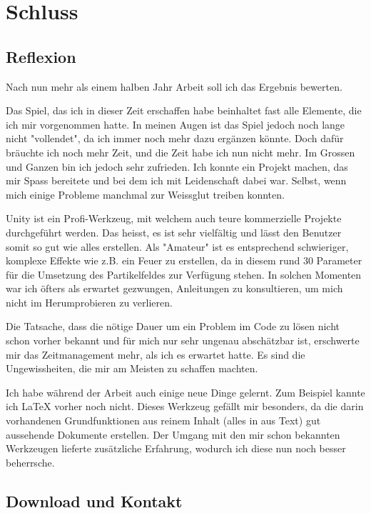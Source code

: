 \chapter{Schluss}

\section{Reflexion }

Nach nun mehr als einem halben Jahr Arbeit soll ich das Ergebnis bewerten.

\smallskip
Das Spiel, das ich in dieser Zeit erschaffen habe beinhaltet fast alle Elemente, die ich mir vorgenommen hatte.
In meinen Augen ist das Spiel jedoch noch lange nicht "vollendet", da ich immer noch mehr dazu ergänzen könnte.
Doch dafür bräuchte ich noch mehr Zeit, und die Zeit habe ich nun nicht mehr.
Im Grossen und Ganzen bin ich jedoch sehr zufrieden. Ich konnte ein Projekt machen, das mir Spass bereitete und bei dem ich mit Leidenschaft dabei war. Selbst, wenn mich einige Probleme manchmal zur Weissglut treiben konnten. 

\smallskip
Unity ist ein Profi-Werkzeug, mit welchem auch teure kommerzielle Projekte durchgeführt werden. Das heisst, es ist sehr vielfältig und lässt den Benutzer somit so gut wie alles erstellen.
Als "Amateur" ist es entsprechend schwieriger, komplexe Effekte wie z.B. ein Feuer zu erstellen, da in diesem rund 30 Parameter für die Umsetzung des Partikelfeldes zur Verfügung stehen.
In solchen Momenten war ich öfters als erwartet gezwungen, Anleitungen zu konsultieren, um mich nicht im Herumprobieren zu verlieren.

\smallskip
Die Tatsache, dass die nötige Dauer um ein Problem im Code zu lösen nicht schon vorher bekannt  und für mich nur sehr ungenau abschätzbar ist, erschwerte mir das Zeitmanagement mehr, als ich es erwartet hatte.
Es sind die Ungewissheiten, die mir am Meisten zu schaffen machten.

\smallskip
Ich habe während der Arbeit auch einige neue Dinge gelernt.
Zum Beispiel kannte ich LaTeX vorher noch nicht.
Dieses Werkzeug gefällt mir besonders, da die darin vorhandenen Grundfunktionen aus reinem Inhalt (alles in aus Text) gut aussehende Dokumente erstellen.
Der Umgang mit den mir schon bekannten Werkzeugen lieferte zusätzliche Erfahrung, wodurch ich diese nun noch besser beherrsche.

\section{Download und Kontakt}

